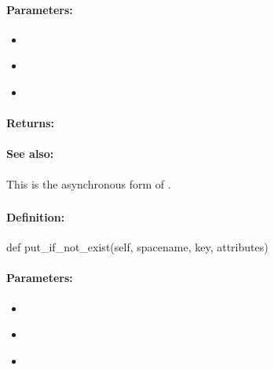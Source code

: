 \paragraph{Parameters:}
\begin{itemize}[noitemsep]
\item {}\\

\item {}\\

\item {}\\

\end{itemize}

\paragraph{Returns:}


\paragraph{See also:}  This is the asynchronous form of .

\pagebreak
\subsubsection{}
\label{api:python:put_if_not_exist}


\paragraph{Definition:}
\begin{pythoncode}
def put_if_not_exist(self, spacename, key, attributes)
\end{pythoncode}

\paragraph{Parameters:}
\begin{itemize}[noitemsep]
\item {}\\

\item {}\\

\item {}\\

\end{itemize}

